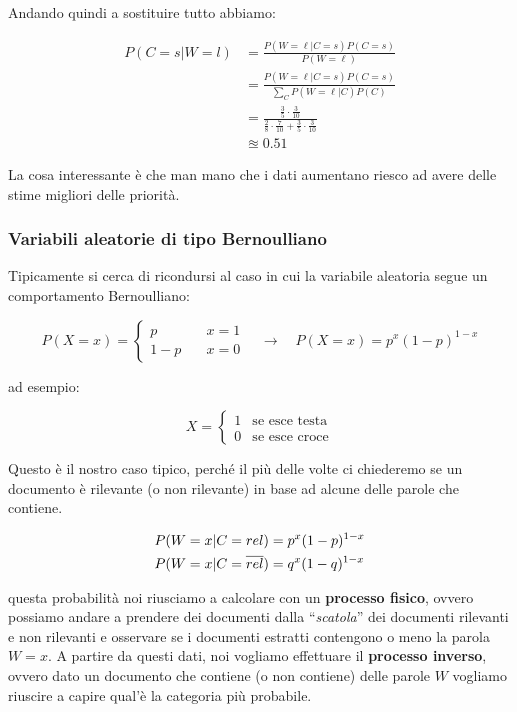 Andando quindi a sostituire tutto abbiamo:

\begin{align*}
	P(C = s | W = l) &= \frac{P(W = \ell | C = s)P(C=s)}{P(W = \ell)} \\
	                 &= \frac{P(W = \ell | C = s)P(C=s)}{\sum\limits_{C} P(W = \ell | C)P(C)} \\
	                 &= \frac{\frac{3}{5}\cdot\frac{3}{10}}{ \frac{2}{8}\cdot\frac{7}{10} + \frac{3}{5}\cdot\frac{3}{10} } \\
					 &\approxeq 0.51
\end{align*}

\noindent La cosa interessante è che man mano che i dati aumentano riesco ad avere delle stime migliori delle priorità.

\subsubsection{Variabili aleatorie di tipo Bernoulliano}

Tipicamente si cerca di ricondursi al caso in cui la variabile aleatoria segue un comportamento Bernoulliano:

$$
P(X = x) = \begin{cases}
p \quad& x= 1 \\
1-p \quad& x=0
\end{cases} \quad \rightarrow \quad P(X = x)=  p^x(1-p)^{1-x}
$$

\noindent ad esempio:

$$
X = \begin{cases}
1 &\text{se esce testa} \\
0 &\text{se esce croce}
\end{cases}
$$

Questo è il nostro caso tipico, perché il più delle volte ci chiederemo se un documento è rilevante (o non rilevante) in base ad alcune delle parole che contiene.

\begin{align*}
	P(W = x | C = rel) &= p^x(1-p)^{1-x}\\
	P(W = x | C = \overline{rel}) &= q^x(1-q)^{1-x}
\end{align*}

\noindent questa probabilità noi riusciamo a calcolare con un \textbf{processo fisico}, ovvero possiamo andare a prendere dei documenti dalla ``\textit{scatola}'' dei documenti rilevanti e non rilevanti e osservare se i documenti estratti contengono o meno la parola $W = x$.
A partire da questi dati, noi vogliamo effettuare il \textbf{processo inverso}, ovvero dato un documento che contiene (o non contiene) delle parole $W$ vogliamo riuscire a capire qual'è la categoria più probabile.

